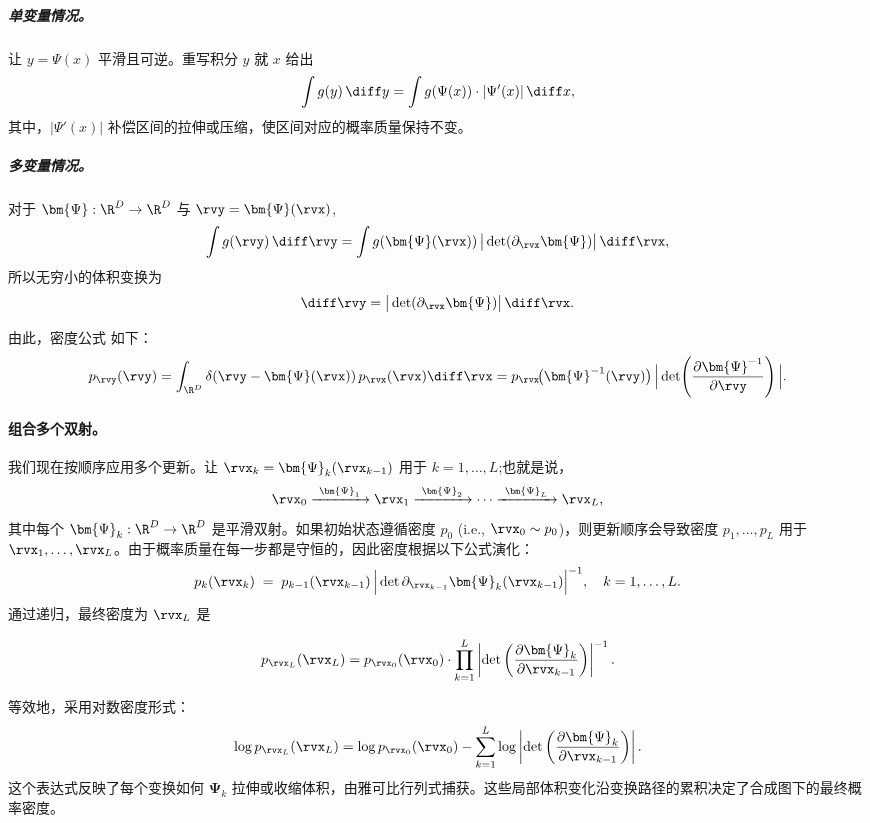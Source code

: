 \subparagraph{单变量情况。}
让 $y = \Psi(x)$ 平滑且可逆。重写积分 $y$ 就 $x$ 给出
\[
\int g(y)\,\diff y = \int g(\Psi(x)) \cdot |\Psi'(x)|\,\diff x,
\]
其中，$|\Psi'(x)|$ 补偿区间的拉伸或压缩，使区间对应的概率质量保持不变。

\subparagraph{多变量情况。}
对于 $\bm{\Psi}: \R^D \to \R^D$ 与 $\rvy=\bm{\Psi}(\rvx)$,
\[
\int g(\rvy)\,\diff\rvy
= \int g(\bm{\Psi}(\rvx)) \,\big|\det(\partial_\rvx \bm{\Psi})\big| \,\diff\rvx,
\]
所以无穷小的体积变换为
\[
\diff \rvy = \big|\det(\partial_\rvx \bm{\Psi})\big|\,\diff \rvx.
\]

由此，密度公式  如下：
\begin{align*}
p_{\rvy}(\rvy)
= \int_{\R^D} \delta(\rvy - \bm{\Psi}(\rvx))\, p_{\rvx}(\rvx)\diff \rvx = p_{\rvx}\!\big(\bm{\Psi}^{-1}(\rvy)\big)\,\Big|\det\!\left(\frac{\partial \bm{\Psi}^{-1}}{\partial \rvy}\right)\Big|.
\end{align*}


\paragraph{组合多个双射。} 我们现在按顺序应用多个更新。让 $\rvx_k = \bm{\Psi}_k(\rvx_{k-1})$ 用于 $k=1,\dots,L$;也就是说，
\[
\rvx_0 \xrightarrow{\ \bm{\Psi}_1\ } \rvx_1 \xrightarrow{\ \bm{\Psi}_2\ } \cdots
\xrightarrow{\ \bm{\Psi}_L\ } \rvx_L,
\]
其中每个 $\bm{\Psi}_k:\R^D \to \R^D$ 是平滑双射。如果初始状态遵循密度 $p_0$ (i.e., $\rvx_0 \sim p_0$)，则更新顺序会导致密度 $p_1,\dots,p_L$ 用于 $\rvx_1,\dots,\rvx_L$。由于概率质量在每一步都是守恒的，因此密度根据以下公式演化：
\[
p_{k}(\rvx_k) \;=\; p_{k-1}(\rvx_{k-1}) \,
   \Big|\det \partial_{\rvx_{k-1}} \bm{\Psi}_k(\rvx_{k-1})\Big|^{-1},
   \quad k=1,\dots,L.
\]
通过递归，最终密度为 $\rvx_L$ 是
\begin{mdframed}
\begin{align}\label{eq:cov-multi-layer-nolog}
    p_{\rvx_L}(\rvx_L)
    = p_{\rvx_0}(\rvx_0)
    \cdot \prod_{k=1}^L \left| \det \left( \frac{\partial \bm{\Psi}_k}{\partial \rvx_{k-1}} \right) \right|^{-1}.
\end{align}
\end{mdframed}
等效地，采用对数密度形式：
\begin{align*}
    \log p_{\rvx_L}(\rvx_L)
    = \log p_{\rvx_0}(\rvx_0)
    - \sum_{k=1}^L \log \left| \det \left( \frac{\partial \bm{\Psi}_k}{\partial \rvx_{k-1}} \right) \right|.
\end{align*}
这个表达式反映了每个变换如何 $\bm{\Psi}_k$ 拉伸或收缩体积，由雅可比行列式捕获。这些局部体积变化沿变换路径的累积决定了合成图下的最终概率密度。

